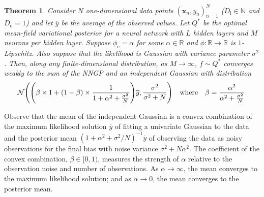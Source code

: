 \documentclass[twoside]{article}
\renewcommand{\ss}[1]{_{\text{#1}}}
\newcommand{\vx}{\mathbf{x}}
\newcommand{\N}{\mathbb{N}}
\newcommand{\R}{\mathbb{R}}
\newcommand{\Normal}{\mathcal{N}}
\renewcommand{\ss}[1]{_{\text{#1}}}        %
\DeclarePairedDelimiter\parens{(}{)}             %
\theoremstyle{theoremstyle}
\newtheorem{theorem}{Theorem}
\begin{document}
\begin{theorem}
    Consider $N$ one-dimensional data points $(\vx_n, y_n)_{n=1}^N$ ($D\ss{i}\in \N$ and $D\ss{o}=1$) and let $\overline{y}$ be the average of the observed values.
    Let $Q^*$ be the optimal mean-field variational posterior for a neural network with $L$ hidden layers and $M$ neurons per hidden layer.
    Suppose $\phi\ss{e}=\alpha$ for some $\alpha \in \R$ and $\phi\colon \R \to \R$ is $1$-Lipschitz.
    Also suppose that the likelihood is Gaussian with variance parameter $\sigma^2$.
    Then, along any finite-dimensional distribution, as $M \to \infty$, $f \sim Q^*$ converges weakly to the sum of the NNGP and an independent Gaussian with distribution 
    \begin{equation}
        \Normal\parens*{ \parens*{\beta \times 1 + (1 - \beta) \times \frac{1}{1 + \alpha^2 + \frac{\sigma^2}{N}}} \overline{y}, \frac{\sigma^2}{\sigma^2 + N}}
        \quad \text{where} \quad
        \beta = \frac{\alpha^2}{\alpha^2 + \frac{\sigma^2}{N}}.
    \end{equation}
\end{theorem}

Observe that the mean of the independent Gaussian is a convex combination of the maximum likelihood solution $\overline{y}$ of fitting a univariate Gaussian to the data and the posterior mean $(1 + \alpha^2 + \sigma^2/N)^{-1} \overline{y}$ of observing the data as noisy observations for the final bias with noise variance $\sigma^2 + N \alpha^2$.
The coefficient of the convex combination, $\beta \in [0, 1)$, measures the strength of $\alpha$ relative to the observation noise and number of observations.
As $\alpha \to \infty$, the mean converges to the maximum likelihood solution;
and as $\alpha \to 0$, the mean converges to the posterior mean.
\end{document}
